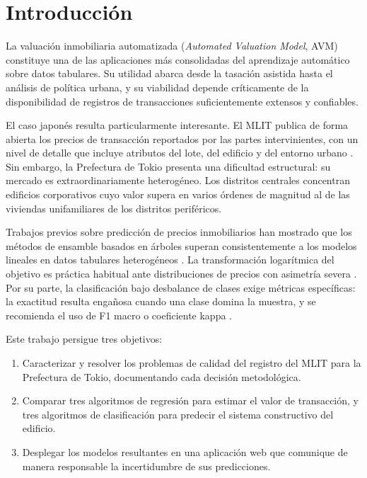\documentclass[conference]{IEEEtran}
\begin{document}
\section{Introducción}

La valuación inmobiliaria automatizada (\textit{Automated Valuation Model}, AVM) constituye una
de las aplicaciones más consolidadas del aprendizaje automático sobre datos tabulares. Su
utilidad abarca desde la tasación asistida hasta el análisis de política urbana, y su
viabilidad depende críticamente de la disponibilidad de registros de transacciones
suficientemente extensos y confiables.

El caso japonés resulta particularmente interesante. El MLIT publica de forma abierta los
precios de transacción reportados por las partes intervinientes, con un nivel de detalle que
incluye atributos del lote, del edificio y del entorno urbano \cite{mlit}. Sin embargo, la
Prefectura de Tokio presenta una dificultad estructural: su mercado es extraordinariamente
heterogéneo. Los distritos centrales concentran edificios corporativos cuyo valor supera en
varios órdenes de magnitud al de las viviendas unifamiliares de los distritos periféricos.

Trabajos previos sobre predicción de precios inmobiliarios han mostrado que los métodos de
ensamble basados en árboles superan consistentemente a los modelos lineales en datos
tabulares heterogéneos \cite{chen2016,breiman2001}. La transformación logarítmica del objetivo
es práctica habitual ante distribuciones de precios con asimetría severa \cite{hastie2009}.
Por su parte, la clasificación bajo desbalance de clases exige métricas específicas: la
exactitud resulta engañosa cuando una clase domina la muestra, y se recomienda el uso de
F1 macro o coeficiente kappa \cite{he2009}.

Este trabajo persigue tres objetivos:

\begin{enumerate}
\item Caracterizar y resolver los problemas de calidad del registro del MLIT para la
      Prefectura de Tokio, documentando cada decisión metodológica.
\item Comparar tres algoritmos de regresión para estimar el valor de transacción, y tres
      algoritmos de clasificación para predecir el sistema constructivo del edificio.
\item Desplegar los modelos resultantes en una aplicación web que comunique de manera
      responsable la incertidumbre de sus predicciones.
\end{enumerate}
\end{document}
